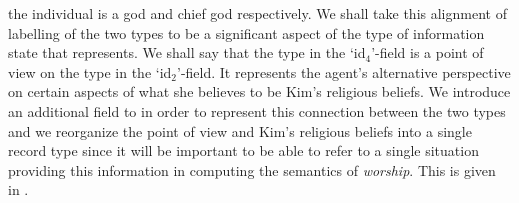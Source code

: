 the individual is a god and chief god respectively.  We shall take
this alignment of labelling of the two types to be a significant
aspect of the type of information state that \preveg{} represents.  We
shall say that the type in the `id$_4$'-field is a point of
  view on the type in the `id$_2$'-field.  It represents the agent's
alternative perspective on certain aspects of what she believes to be
Kim's religious beliefs.    We introduce an additional field to \preveg{} in order
to represent this connection between the two types and we reorganize
the point of view and Kim's religious beliefs into a single record
type since it will be important to be able to refer to a single
situation providing this information in computing the semantics of
\textit{worship}. This is given in \nexteg{}.


 
 

